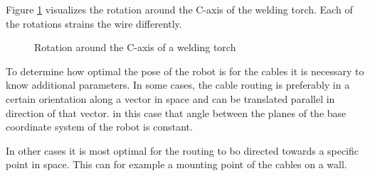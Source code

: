 Figure \ref{rot} visualizes the rotation around the C-axis of the welding torch. Each of the rotations strains the wire differently.

\begin{figure}[H]%
	\centering
	\qquad
	\caption{Rotation around the C-axis of a welding torch }%
	\label{rot}%
\end{figure}
 
To determine how optimal the pose of the robot is for the cables it is necessary to know additional parameters. 
In some cases, the cable routing is preferably in a certain orientation along a vector in space and can be translated parallel in direction of that vector. in this case that angle between the planes of the base coordinate system of the robot is constant. 


In other cases it is most optimal for the routing to bo directed towards a specific point in space. This can for example a mounting point of the cables on a wall.  



